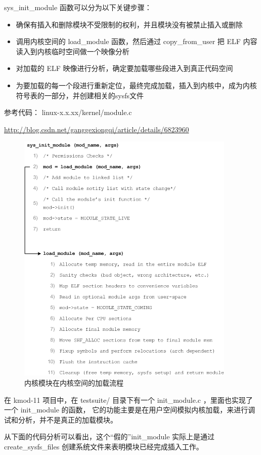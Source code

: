 sys\_init\_module 函数可以分为以下关键步骤：

\begin{itemize}
\item
  确保有插入和删除模块不受限制的权利，并且模块没有被禁止插入或删除\\
\item
  调用内核空间的 load\_module 函数，然后通过 copy\_from\_user 把 ELF
  内容读入到内核临时空间做一个映像分析
\item
  对加载的 ELF 映像进行分析，确定要加载哪些段进入到真正代码空间
\item
  为要加载的每一个段进行重新定位，最终完成加载，插入到内核中，成为内核符号表的一部分，并创建相关的sysfs文件
\end{itemize}
参考代码： linux-x.x.xx/kernel/module.c

\url{http://blog.csdn.net/ganggexiongqi/article/details/6823960}

\begin{figure}[htbp]
\centering
\includegraphics{./figures/sys_init_module.jpg}
\caption{内核模块在内核空间的加载流程}
\end{figure}

在 kmod-11 项目中，在 testsuite/ 目录下有一个 init\_module.c
，里面也实现了一个 init\_module 的函数，
它的功能主要是在用户空间模拟内核加载，来进行调试和分析，并不是真正的加载模块。

从下面的代码分析可以看出，这个``假的''init\_module 实际上是通过
create\_sysfs\_files 创建系统文件来表明模块已经完成插入工作。

